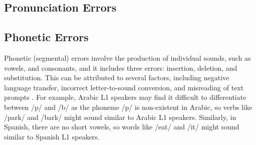 \documentclass[11pt]{article}
\begin{document}
\subsection{Pronunciation Errors}
\subsection*{Phonetic Errors}
Phonetic (segmental) errors involve the production of individual sounds, such as vowels, and consonants, and it includes three errors: insertion, deletion, and substitution. %
This can be attributed to several factors, including negative language transfer, incorrect letter-to-sound conversion, and misreading of text prompts \cite{meng2007deriving, qian2010capturing, kartushina2014effects, li2016mispronunciation}. 
For example, Arabic L1 speakers may find it difficult to differentiate between /p/ and /b/ as the phoneme /p/ is non-existent in Arabic, so verbs like /park/ and /bark/ might sound similar to Arabic L1 speakers. Similarly, in Spanish, there are no short vowels, so words like /eat/ and /it/ might sound similar to Spanish L1 speakers.







\end{document}
